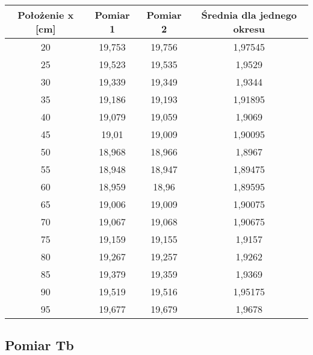 \documentclass[polish,a4paper]{article}
\begin{document}
\begin{table}[H]
\centering
\begin{tabular}{|c|c|c|c|}
\hline
Położenie x [cm] & Pomiar 1 & Pomiar 2 & Średnia dla jednego okresu\\
\hline 
20 &	19,753 &	19,756 &	1,97545 \\
25 &	19,523 &	19,535 &	1,9529 \\
30 &	19,339 &	19,349 &	1,9344 \\
35 &	19,186 &	19,193 &	1,91895 \\
40 &	19,079 &	19,059 &	1,9069 \\
45 &	19,01 &	19,009 &	1,90095 \\
50 &	18,968 &	18,966 &	1,8967 \\
55 &	18,948 &	18,947 &	1,89475 \\
60 &	18,959 &	18,96 &	1,89595 \\
65 &	19,006 &	19,009 &	1,90075 \\
70 &	19,067 &	19,068 &	1,90675 \\
75 &	19,159 &	19,155 &	1,9157 \\
80 &	19,267 &	19,257 &	1,9262 \\
85 &	19,379 &	19,359 &	1,9369 \\
90 &	19,519 &	19,516 &	1,95175 \\
95 &	19,677 &	19,679 &	1,9678 \\

\hline
\end{tabular}
\end{table}

\subsection{Pomiar Tb}
\end{document}
